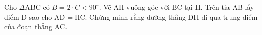 \begin{bt}
   Cho $\Delta \mathrm{ABC}$ có $B=2 \cdot C<90^{\circ}$. Vẽ $\mathrm{AH}$ vuông góc với $\mathrm{BC}$ tại $\mathrm{H}$. Trên tia $\mathrm{AB}$ lấy điểm $\mathrm{D}$ sao cho $\mathrm{AD}=\mathrm{HC}$. Chứng minh rằng đường thẳng $\mathrm{DH}$ đi qua trung điểm của đoạn thẳng $\mathrm{AC}$.
\loigiai{}
\end{bt}

